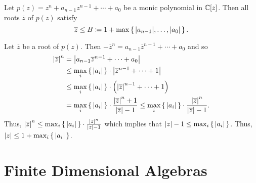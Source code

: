 \documentclass[letterpaper, 11pt, oneside]{book}
\begin{document}
\begin{exercise}\label{ex:UAG_2.1.10}
  Let $p(z) = z^{n} + a_{n - 1}z^{n - 1} + \cdots + a_{0}$ be a monic polynomial in $\mathbb{C}[z]$.
  Then all roots $\overline{z}$ of $p(z)$ satisfy
  \[
    \overline{z} \leq B \coloneqq 1 + \max\set{\abs{a_{n - 1}}, \ldots, \abs{a_{0}}}.
  \]
\end{exercise}
\begin{pf}
  Let $\overline{z}$ be a root of $p(z)$.
  Then $-\overline{z}^{n} = a_{n - 1}\overline{z}^{n - 1} + \cdots + a_{0}$ and so
  \begin{align*}
    \abs{\overline{z}}^{n} &= \abs{a_{n - 1}\overline{z}^{n - 1} + \cdots + a_{0}} \\
                           &\leq \max_{i}\set{\abs{a_{i}}} \cdot \abs{\overline{z}^{n - 1} + \cdots + 1} \\
                           &\leq \max_{i}\set{\abs{a_{i}}} \cdot \pqty{\abs{\overline{z}}^{n - 1} + \cdots + 1} \\
                           &= \max_{i}\set{\abs{a_{i}}} \cdot \frac{\abs{\overline{z}}^{n} + 1}{\abs{\overline{z}} - 1} \leq \max_{i}\set{\abs{a_{i}}} \cdot \frac{\abs{\overline{z}}^{n}}{\abs{\overline{z}} - 1}.
  \end{align*}
  Thus, $\abs{\overline{z}}^{n} \leq \max_{i}\set{\abs{a_{i}}} \cdot \frac{\abs{z}^{n}}{\abs{z} - 1}$ which implies that $\abs{z} - 1 \leq \max_{i}\set{\abs{a_{i}}}$.
  Thus, $\abs{z} \leq 1 + \max_{i}\set{\abs{a_{i}}}$.
\end{pf}

\clearpage

\section{Finite Dimensional Algebras}

\begin{exercise}\label{ex:UAG_2.2.1}
\end{exercise}
\end{document}
